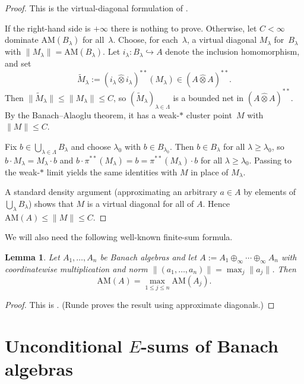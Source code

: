 \documentclass[reqno]{amsart}
\theoremstyle{plain}
\newtheorem{lemma}[theorem]{Lemma}
\theoremstyle{definition}
\theoremstyle{remark}
\newcommand{\AM}{\mathrm{AM}}
\newcommand{\hatot}{\widehat{\otimes}}
\renewcommand{\le}{\leqslant}
\renewcommand{\ge}{\geqslant}
\begin{document}
\begin{proof}
This is the virtual-diagonal formulation of \cite[Proposition~2.3.15]{Runde2020ABA}.

If the right-hand side is $+\infty$ there is nothing to prove. Otherwise, let $C<\infty$ dominate
$\AM(B_\lambda)$ for all~$\lambda$.
Choose, for each~$\lambda$, a virtual diagonal $M_\lambda$ for~$B_\lambda$ with $\|M_\lambda\|=\AM(B_\lambda)$.
Let $i_\lambda\colon B_\lambda\hookrightarrow A$ denote the inclusion homomorphism, and set
\[
\widetilde M_\lambda := (i_\lambda\hatot i_\lambda)^{**}(M_\lambda)\in (A\hatot A)^{**}.
\]
Then $\|\widetilde M_\lambda\|\le \|M_\lambda\|\le C$, so $(\widetilde M_\lambda)_{\lambda\in\Lambda}$
is a bounded net in $(A\hatot A)^{**}$.
By the Banach--Alaoglu theorem, it has a weak-$*$ cluster point~$M$ with $\|M\|\le C$.


Fix $b\in\bigcup_{\lambda\in\Lambda}B_\lambda$ and choose $\lambda_0$ with $b\in B_{\lambda_0}$.
Then $b\in B_\lambda$ for all $\lambda\ge \lambda_0$, so $b\cdot M_\lambda=M_\lambda\cdot b$ and
$b\cdot\pi^{**}(M_\lambda)=b=\pi^{**}(M_\lambda)\cdot b$ for all $\lambda\ge\lambda_0$.
Passing to the weak-$*$ limit yields the same identities with $M$ in place of $M_\lambda$.

A standard density argument (approximating an arbitrary $a\in A$ by elements of $\bigcup_\lambda B_\lambda$)
shows that $M$ is a virtual diagonal for all of $A$. Hence $\AM(A)\le \|M\|\le C$.
\end{proof}


We will also need the following well-known finite-sum formula.

\begin{lemma}\label{lem:finite-infty}
Let $A_1,\dots,A_n$ be Banach algebras and let $A:=A_1\oplus_\infty\cdots\oplus_\infty A_n$
with coordinatewise multiplication and norm $\|(a_1,\dots,a_n)\|=\max_j\|a_j\|$.
Then
\[
\AM(A)=\max_{1\le j\le n}\AM(A_j).
\]
\end{lemma}

\begin{proof}
This is \cite[Lemma~2.3.18]{Runde2020ABA}.  (Runde proves the result using approximate diagonals.)
\end{proof}


\section{Unconditional $E$-sums of Banach algebras}\label{sec:E-sums}
\end{document}
